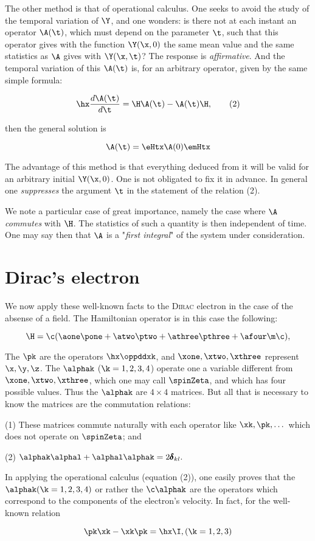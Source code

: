 \documentclass{article}
\newcommand{\nequ}[2]{
\begin{equation*}
#1
\tag{#2}
\end{equation*}
}
\newcommand{\uequ}[1]{
\begin{equation*}
#1
\end{equation*}
}
\newcommand{\dXdY}[2]{
\frac{d{#1}}{d{#2}}
}
\newcommand{\ddt}[1]{\dXdY{#1}{\t}}
\newcommand{\func}[1]{\pmb{#1}}
\renewcommand{\it}[1]{\textit{#1}}
\renewcommand{\sc}[1]{\textsc{#1}}
\newcommand{\kronecker}[1]{\func{\delta}_{#1}}
\begin{document}
The other method is that of operational calculus. One seeks to avoid the study of the temporal variation of $\Y$, and one wonders: is there not at each instant an operator $\A(\t)$, which must depend on the parameter $\t$, such that this operator gives with the function $\Y(\x, 0)$ the same mean value and the same statistics as $\A$ gives with $\Y(\x, \t)$? The response is \it{affirmative}. And the temporal variation of this $\A(\t)$ is, for an arbitrary operator, given by the same simple formula:
\nequ{
\hx\ddt{\A(\t)} = \H\A(\t) - \A(\t)\H,
}{2}
then the general solution is

\uequ{
\A(\t) = \eHtx\A(0)\emHtx
}

The advantage of this method is that everything deduced from it will be valid for an arbitrary initial $\Y(\x, 0)$. One is not obligated to fix it in advance. In general one \it{suppresses} the argument $\t$ in the statement of the relation (2).

We note a particular case of great importance, namely the case where $\A$ \it{commutes} with $\H$. The statistics of such a quantity is then independent of time. One may say then that $\A$ is a "\it{first integral}" of the system under consideration.

\section{Dirac's electron}

We now apply these well-known facts to the \sc{Dirac} electron in the case of the absense of a field. The Hamiltonian operator is in this case the following:

\uequ{
\H = \c(\aone\pone + \atwo\ptwo + \athree\pthree + \afour\m\c),
}

The $\pk$ are the operators $\hx\oppddxk$, and $\xone, \xtwo, \xthree$ represent $\x, \y, \z$. The $\alphak$ ($\k=1,2,3,4$) operate one a variable different from $\xone, \xtwo, \xthree$, which one may call $\spinZeta$, and which has four possible values. Thus the $\alphak$ are $4\times4$ matrices. But all that is necessary to know the matrices are the commutation relations:

(1) These matrices commute naturally with each operator like $\xk, \pk, \dots$ which does not operate on $\spinZeta$; and

(2) $\alphak\alphal + \alphal\alphak = 2\kronecker{kl}.$

In applying the operational calculus (equation (2)), one easily proves that the $\alphak (\k = 1, 2, 3, 4)$ or rather the $\c\alphak$ are the operators which correspond to the components of the electron's velocity. In fact, for the well-known relation
\uequ{
\pk\xk
- \xk\pk = \hx\I, (\k = 1, 2, 3)}
\end{document}
